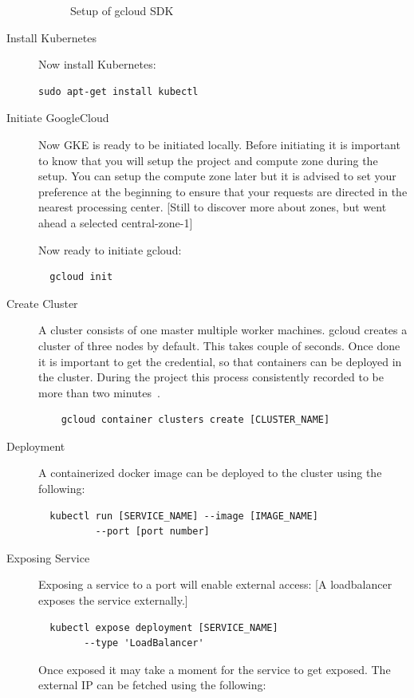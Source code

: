 \begin{description}
\begin{figure}[htb]
\begin{footnotesize}
\end{footnotesize}
\caption{Setup of gcloud SDK}\label{F:setup}
\end{figure}


\item[Install Kubernetes] Now install Kubernetes:

\begin{verbatim}
sudo apt-get install kubectl
\end{verbatim}

\item[Initiate GoogleCloud] Now GKE is ready to be initiated locally. Before
initiating it is important to know that you will setup the project and compute
zone during the setup. You can setup the compute zone later but it is advised
to set your preference at the beginning to ensure that your requests are
directed in the nearest processing center. [Still to discover more about
zones, but went ahead a selected central-zone-1] 

Now ready to initiate gcloud:
\begin{verbatim}
  gcloud init
\end{verbatim}

\item[Create Cluster] A cluster consists of one master multiple worker
machines. gcloud creates a cluster of three nodes by default. This takes
couple of seconds. Once done it is important to get the credential, so that
containers can be deployed in the cluster. During the project this process
consistently recorded to be more than two
minutes~\cite{hid-sp18-417-cluster-creation-video}.

  \begin{verbatim}
    gcloud container clusters create [CLUSTER_NAME]
  \end{verbatim}
\item[Deployment] A containerized docker image can be deployed to the cluster
using the following:
\begin{verbatim}
  kubectl run [SERVICE_NAME] --image [IMAGE_NAME] 
          --port [port number]
\end{verbatim}
\item [Exposing Service] Exposing a service to a port will enable external
access: [A loadbalancer exposes the service externally.]
\begin{verbatim}
  kubectl expose deployment [SERVICE_NAME] 
        --type 'LoadBalancer'
\end{verbatim}

Once exposed it may take a moment for the service to get exposed. The external
IP can be fetched using the following:


\end{description}
